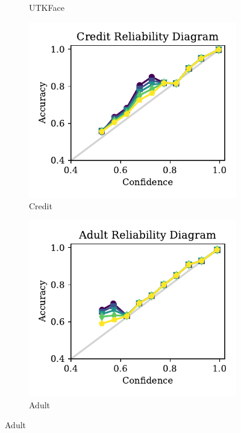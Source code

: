 \begin{figure}[t]
\begin{subfigure}[b]{0.24\textwidth}
  \caption{UTKFace}
\end{subfigure}
\hfill
\begin{subfigure}[b]{0.24\textwidth}
  \centering
  \includegraphics[width=\linewidth]{figs/confidential_guardian/credit_ref_abl.pdf}
  \caption{Credit}
\end{subfigure}
\hfill
\begin{subfigure}[b]{0.24\textwidth}
  \centering
  \includegraphics[width=\linewidth]{figs/confidential_guardian/adult_ref_abl.pdf}
  \caption{Adult}
\end{subfigure}


\end{figure}
